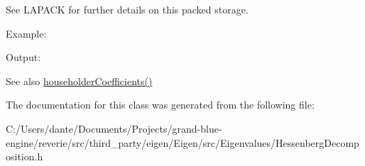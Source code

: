 See L\+A\+P\+A\+CK for further details on this packed storage.

Example\+: 
\begin{DoxyCodeInclude}{0}
\end{DoxyCodeInclude}
 Output\+: 
\begin{DoxyVerbInclude}
\end{DoxyVerbInclude}


\begin{DoxySeeAlso}{See also}
\mbox{\hyperlink{class_eigen_1_1_hessenberg_decomposition_a65fa81ce79d956baa59a30a6d82f8a84}{householder\+Coefficients()}} 
\end{DoxySeeAlso}


The documentation for this class was generated from the following file\+:\begin{DoxyCompactItemize}
\item 
C\+:/\+Users/dante/\+Documents/\+Projects/grand-\/blue-\/engine/reverie/src/third\+\_\+party/eigen/\+Eigen/src/\+Eigenvalues/Hessenberg\+Decomposition.\+h\end{DoxyCompactItemize}
